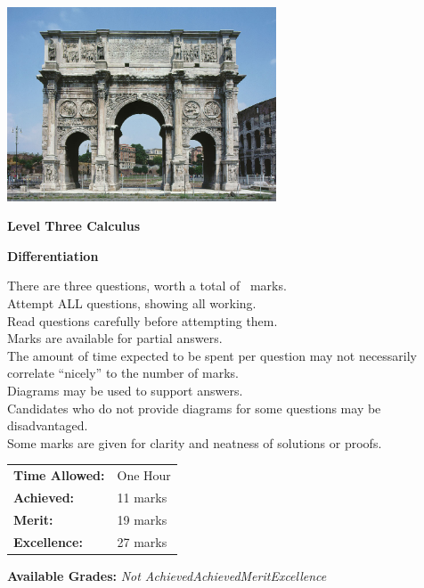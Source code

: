 \documentclass[a4paper,addpoints]{exam}
\begin{document}
\begin{coverpages}

\begin{center}
  \includegraphics[width=0.6\textwidth]{exam-cover-03}

  \vspace{5mm}

  \textbf{\Huge{Level Three Calculus}}

  \vspace{2mm}

  \textbf{\Huge{Differentiation}}
\end{center}

\vspace{5mm}

\noindent
\large{There are three questions, worth a total of \numpoints\ marks.\\
       Attempt ALL questions, showing all working.\\
       Read questions carefully before attempting them.\\
       Marks are available for partial answers.\\
       The amount of time expected to be spent per question may not necessarily correlate ``nicely'' to the number of marks.\\
       Diagrams may be used to support answers.\\
       Candidates who do not provide diagrams for some questions may be disadvantaged.\\
       Some marks are given for clarity and neatness of solutions or proofs.}
\vspace{2mm}

\begin{tabular}{ll}
  \textbf{Time Allowed:}& One Hour\\
  \textbf{Achieved:}& 11 marks\\
  \textbf{Merit:}& 19 marks\\
  \textbf{Excellence:}& 27 marks
\end{tabular}

\vfill

\begin{center}
  \gradetable[h][questions]
  \vspace{2mm}

  \textbf{Available Grades:} \textit{Not Achieved}\quad\textit{Achieved}\quad\textit{Merit}\quad\textit{Excellence}
\end{center}

\end{coverpages}
\end{document}
